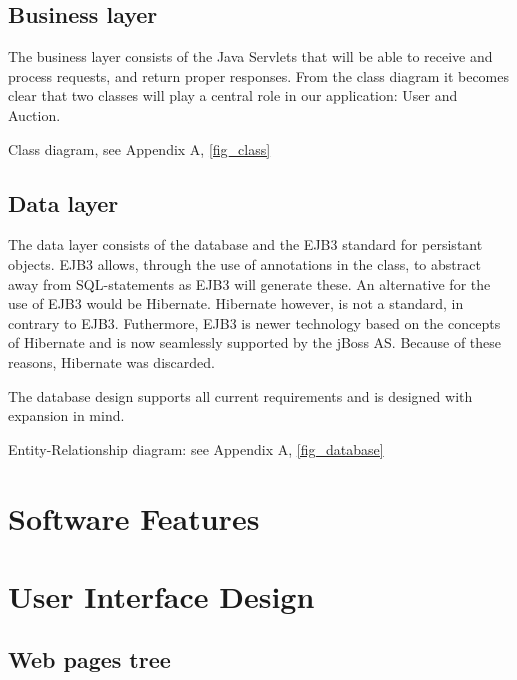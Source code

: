 \documentclass[a4paper, 12pt]{report}
\begin{document}
\section{Business layer}
The business layer consists of the Java Servlets that will be able to receive and process requests, and return proper responses.
From the class diagram it becomes clear that two classes will play a central role in our application: User and Auction.

Class diagram, see Appendix A, \ref{fig_class}

\section{Data layer}
The data layer consists of the database and the EJB3 standard for persistant objects. EJB3 allows, through the use of annotations in the class, to abstract away from SQL-statements as EJB3 will generate these.
An alternative for the use of EJB3 would be Hibernate. Hibernate however, is not a standard, in contrary to EJB3. Futhermore, EJB3 is newer technology based on the concepts of Hibernate and is now seamlessly supported by the jBoss AS. Because of these reasons, Hibernate was discarded.

The database design supports all current requirements and is designed with expansion in mind.

Entity-Relationship diagram: see Appendix A, \ref{fig_database}

\pagebreak
\chapter{Software Features}




\pagebreak
\chapter{User Interface Design \label{UI Design}}
\section{Web pages tree}
\end{document}
